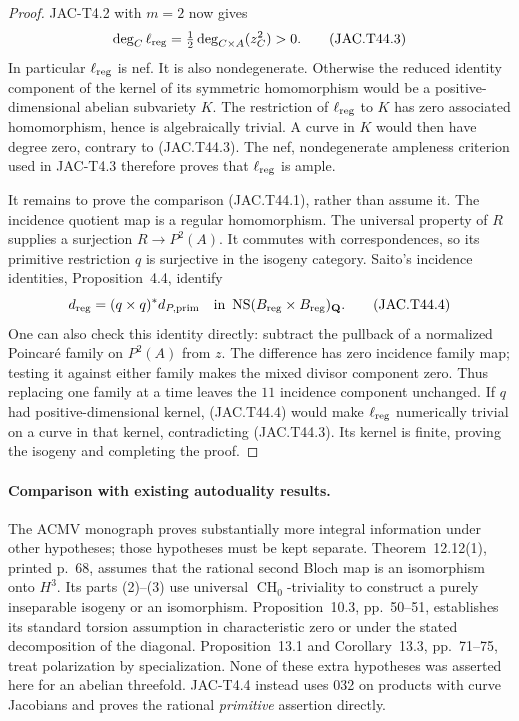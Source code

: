 \begin{proof}
JAC-T4.2 with $m=2$ now gives
\[
 \deg_C\ell_{\rm reg}
       =\tfrac12\deg_{C\times A}(z_C^2)>0.
                                                        \tag{JAC.T44.3}
\]
In particular $\ell_{\rm reg}$ is nef. It is also nondegenerate.
Otherwise the reduced identity component of the kernel of its
symmetric homomorphism would be a positive-dimensional abelian
subvariety $K$. The restriction of $\ell_{\rm reg}$ to $K$ has
zero associated homomorphism, hence is algebraically trivial. A
curve in $K$ would then have degree zero, contrary to
(JAC.T44.3). The nef, nondegenerate ampleness criterion used in
JAC-T4.3 therefore proves that $\ell_{\rm reg}$ is ample.

It remains to prove the comparison (JAC.T44.1), rather than assume
it. The incidence quotient map is a regular homomorphism. The
universal property of $R$ supplies a surjection
$R\to P^2(A)$. It commutes with correspondences, so its primitive
restriction $q$ is surjective in the isogeny category. Saito's
incidence identities, Proposition~4.4, identify
\[
 d_{\rm reg}=(q\times q)^*d_{P,\rm prim}
       \quad\hbox{in }\operatorname{NS}(B_{\rm reg}\times
                                      B_{\rm reg})_{\mathbf Q}.
                                                        \tag{JAC.T44.4}
\]
One can also check this identity directly: subtract the pullback
of a normalized Poincar\'e family on $P^2(A)$ from $z$. The
difference has zero incidence family map; testing it against either
family makes the mixed divisor component zero. Thus replacing one
family at a time leaves the $11$ incidence component unchanged.
If $q$ had positive-dimensional kernel, (JAC.T44.4) would make
$\ell_{\rm reg}$ numerically trivial on a curve in that kernel,
contradicting (JAC.T44.3). Its kernel is finite, proving the
isogeny and completing the proof.
\end{proof}

\paragraph{Comparison with existing autoduality results.}
The ACMV monograph proves substantially more integral information
under other hypotheses; those hypotheses must be kept separate.
Theorem~12.12(1), printed p.~68, assumes that the rational second
Bloch map is an isomorphism onto $H^3$. Its parts (2)--(3) use
universal $\operatorname{CH}_0$-triviality to construct a purely
inseparable isogeny or an isomorphism. Proposition~10.3, pp.~50--51,
establishes its standard torsion assumption in characteristic zero
or under the stated decomposition of the diagonal. Proposition~13.1
and Corollary~13.3, pp.~71--75, treat polarization by specialization.
None of these extra hypotheses was asserted here for an abelian
threefold. JAC-T4.4 instead uses 032 on products with curve Jacobians
and proves the rational \emph{primitive} assertion directly.

